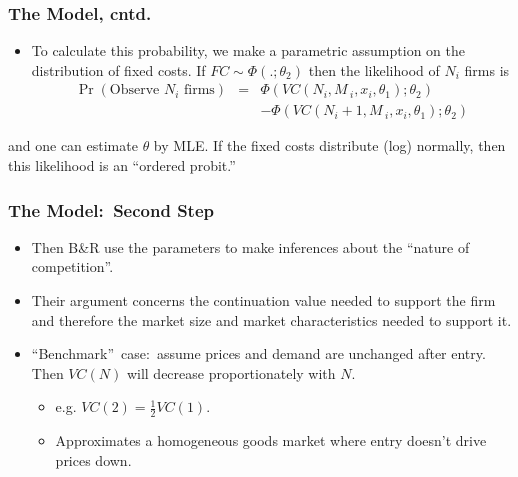 \documentclass[notes=show]{beamer}
\begin{document}
\begin{frame}%

\frametitle{The Model, cntd.}

\begin{itemize}
\item To calculate this probability, we make a parametric assumption on the
distribution of fixed costs. If $FC\sim \Phi (.;\theta _{2})$ then the
likelihood of $N_{i}$ firms is 
\begin{eqnarray}
\Pr (\text{Observe }N_{i}\text{ firms}) &=&\Phi
(VC(N_{i},M\,_{i},x_{i},\theta _{1});\theta _{2})  \label{entry4} \\
&&-\Phi (VC(N_{i}+1,M\,_{i},x_{i},\theta _{1});\theta _{2})
\end{eqnarray}
\end{itemize}

and one can estimate $\theta $ by MLE. If the fixed costs distribute (log)
normally, then this likelihood is an \textquotedblleft ordered
probit.\textquotedblright\ 

\end{frame}%

\begin{frame}%

\frametitle{The Model:\ Second Step}

\begin{itemize}
\item Then B\&R use the parameters to make inferences about the
\textquotedblleft nature of competition\textquotedblright .

\item Their argument concerns the continuation value needed to support the
firm and therefore the market size and market characteristics needed to
support it.

\item \textquotedblleft Benchmark\textquotedblright\ case:\ assume prices
and demand are unchanged after entry. Then $VC(N)$ will decrease
proportionately with $N$.

\begin{itemize}
\item e.g. $VC(2)=\frac{1}{2}VC(1)$.

\item Approximates a homogeneous goods market where entry doesn't drive
prices down.
\end{itemize}
\end{itemize}

\end{frame}%
\end{document}
